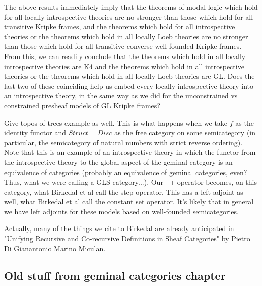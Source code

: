 \begin{TODOblock}
The above results immediately imply that the theorems of modal logic which hold for all locally introspective theories are no stronger than those which hold for all transitive Kripke frames, and the theorems which hold for all introspective theories or the theorems which hold in all locally Loeb theories are no stronger than those which hold for all transitive converse well-founded Kripke frames. From this, we can readily conclude that the theorems which hold in all locally introspective theories are K4 and the theorems which hold in all introspective theories or the theorems which hold in all locally Loeb theories are GL. Does the last two of these coinciding help us embed every locally introspective theory into an introspective theory, in the same way as we did for the unconstrained vs constrained presheaf models of GL Kripke frames?
\end{TODOblock}

\begin{TODOblock}
Give topos of trees example as well. This is what happens when we take $f$ as the identity functor and $Struct = Disc$ as the free category on some semicategory (in particular, the semicategory of natural numbers with strict reverse ordering). Note that this is an example of an introspective theory in which the functor from the introspective theory to the global aspect of the geminal category is an equivalence of categories (probably an equivalence of geminal categories, even? Thus, what we were calling a GLS-category...). Our $\Box$ operator becomes, on this category, what Birkedal et al call the step operator. This has a left adjoint as well, what Birkedal et al call the constant set operator. It's likely that in general we have left adjoints for these models based on well-founded semicategories.

Actually, many of the things we cite to Birkedal are already anticipated in "Unifying Recursive and Co-recursive Definitions in Sheaf Categories" by Pietro Di Gianantonio Marino Miculan.
\end{TODOblock}

\subsection{Old stuff from geminal categories chapter}

